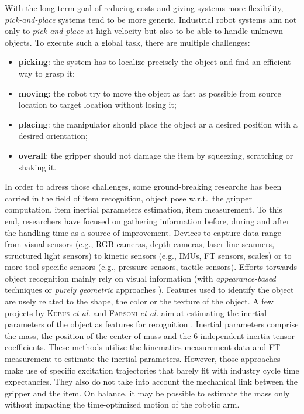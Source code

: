 \documentclass[/home/francois/latex/report/main.tex]{subfiles}
\begin{document}
With the long-term goal of reducing costs and giving systems more flexibility, \textit{pick-and-place} systems tend to be more generic. Industrial robot systems aim not only to \textit{pick-and-place} at high velocity but also to be able to handle unknown objects. To execute such a global task, there are multiple challenges:
\begin{itemize}
	\item \textbf{picking}: the system has to localize precisely the object and find an efficient way to grasp it;
	\item \textbf{moving}: the robot try to move the object as fast as possible from source location to target location without losing it;
	\item \textbf{placing}: the manipulator should place the object ar a desired position with a desired orientation;
	\item \textbf{overall}: the gripper should not damage the item by squeezing, scratching or shaking it.
\end{itemize}

In order to adress those challenges, some ground-breaking researche has been carried in the field of item recognition, object pose w.r.t.\ the gripper computation, item inertial parameters estimation, item measurement. To this end, researchers have focused on gathering information before, during and after the handling time as a source of improvement. Devices to capture data range from visual sensors (e.g., RGB cameras, depth cameras, laser line scanners, structured light sensors) to kinetic sensors (e.g., \ac{IMUs}, \ac{FT} sensors, scales) or to more tool-specific sensors (e.g., pressure sensors, tactile sensors). Efforts torwards object recognition mainly rely on visual information (with \textit{appearance-based} techniques \cite{Carmichael2002, Schmid1997, Viola2001, Murase1993} or \textit{purely geometric} approaches \cite{Hut1987, Sethi2001}). Features used to identify the object are usely related to the shape, the color or the texture of the object. A few projects by \textsc{Kubus} \textit{et al.} and \textsc{Farsoni} \textit{et al.} aim at estimating the inertial parameters of the object as features for recognition \cite{Kubus2008, Kubus2007, Kubus2014, Farsoni2018}. Inertial parameters comprise the mass, the position of the center of mass and the 6 independent inertia tensor coefficients. These methods utilize the kinematics measurement data and \ac{FT} measurement to estimate the inertial parameters. However, those approaches make use of specific excitation trajectories that barely fit with industry cycle time expectancies. They also do not take into account the mechanical link between the gripper and the item. On balance, it may be possible to estimate the mass only without impacting the time-optimized motion of the robotic arm.
\end{document}
